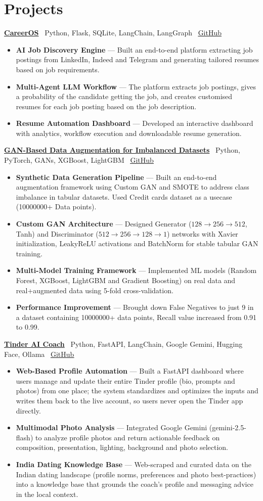 \documentclass[a4paper,10pt]{article}
\newcommand{\resumeItem}[1]{\item\small{#1}}
\newcommand{\resumeProject}[3]{\vspace{6pt}\underline{\textbf{\normalsize #1}} \textbar\ \small #2 \textbar\ \href{#3}{\underline{GitHub}}\vspace{1pt}}
\newcommand{\resumeItemListStart}{\begin{itemize}[leftmargin=0.18in,itemsep=1pt,topsep=1pt]}
\newcommand{\resumeItemListEnd}{\end{itemize}\vspace{1pt}}
\begin{document}
\section{Projects}

\vspace{-4pt}

\resumeProject
{CareerOS}
{Python, Flask, SQLite, LangChain, LangGraph}
{https://github.com/gorredinesh21/JOB_APPLICATION_HANDLER-}
\resumeItemListStart
\resumeItem{
\textbf{AI Job Discovery Engine} --- Built an end-to-end platform extracting job postings from LinkedIn, Indeed and Telegram and generating tailored resumes based on job requirements.
}
\resumeItem{
\textbf{Multi-Agent LLM Workflow} --- The platform extracts job postings, gives a probability of the candidate getting the job, and creates customised resumes for each job posting based on the job description.
}
\resumeItem{
\textbf{Resume Automation Dashboard} --- Developed an interactive dashboard with analytics, workflow execution and downloadable resume generation.
}
\resumeItemListEnd

\resumeProject
{GAN-Based Data Augmentation for Imbalanced Datasets}
{Python, PyTorch, GANs, XGBoost, LightGBM}
{https://github.com/gorredinesh21/FINAL_YEAR_PROJECT/tree/main}
\resumeItemListStart
\resumeItem{
\textbf{Synthetic Data Generation Pipeline} --- Built an end-to-end augmentation framework using Custom GAN and SMOTE to address class imbalance in tabular datasets. Used Credit cards dataset as a usecase (10000000+ Data points).
}
\resumeItem{
\textbf{Custom GAN Architecture} --- Designed Generator ($128 \rightarrow 256 \rightarrow 512$, Tanh) and Discriminator ($512 \rightarrow 256 \rightarrow 128 \rightarrow 1$) networks with Xavier initialization, LeakyReLU activations and BatchNorm for stable tabular GAN training.
}
\resumeItem{
\textbf{Multi-Model Training Framework} --- Implemented ML models (Random Forest, XGBoost, LightGBM and Gradient Boosting) on real data and real+augmented data using 5-fold cross-validation.
}
\resumeItem{
\textbf{Performance Improvement} --- Brought down False Negatives to just 9 in a dataset containing 10000000+ data points, Recall value increased from 0.91 to 0.99.
}
\resumeItemListEnd

\resumeProject
{Tinder AI Coach}
{Python, FastAPI, LangChain, Google Gemini, Hugging Face, Ollama}
{https://github.com/gorredinesh21/TINDER_MCP_AI}
\resumeItemListStart
\resumeItem{
\textbf{Web-Based Profile Automation} --- Built a FastAPI dashboard where users manage and update their entire Tinder profile (bio, prompts and photos) from one place; the system standardizes and optimizes the inputs and writes them back to the live account, so users never open the Tinder app directly.
}
\resumeItem{
\textbf{Multimodal Photo Analysis} --- Integrated Google Gemini (gemini-2.5-flash) to analyze profile photos and return actionable feedback on composition, presentation, lighting, background and photo selection.
}
\resumeItem{
\textbf{India Dating Knowledge Base} --- Web-scraped and curated data on the Indian dating landscape (profile norms, preferences and photo best-practices) into a knowledge base that grounds the coach's profile and messaging advice in the local context.
}
\resumeItemListEnd
\end{document}
